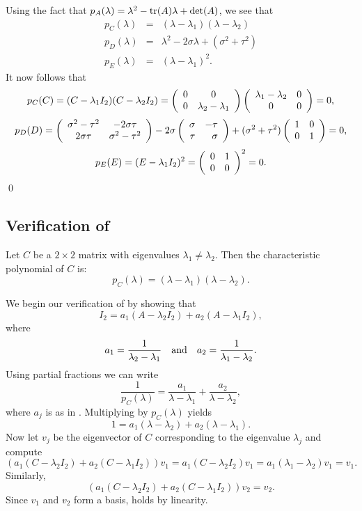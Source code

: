 Using the fact that $p_A(\lambda)=\lambda^2-{\rm tr}(A)\lambda+\det(A)$, we see
that
\begin{eqnarray*}
p_C(\lambda) & = & (\lambda-\lambda_1)(\lambda-\lambda_2) \\
p_D(\lambda) & = & \lambda^2 - 2\sigma \lambda + (\sigma^2+\tau^2) \\
p_E(\lambda) & = & (\lambda-\lambda_1)^2.
\end{eqnarray*}
It now follows that
\[
p_C(C) = (C-\lambda_1I_2)(C-\lambda_2I_2) =
\left(\begin{array}{cc} 0 & 0\\ 0 &\lambda_2-\lambda_1\end{array}\right)\left(\begin{array}{cc} \lambda_1-\lambda_2 & 0\\ 0 &0\end{array}\right)
=0,
\]
\[
p_D(D) =
\left(\begin{array}{cc} \sigma^2-\tau^2 & -2\sigma\tau\\ 2\sigma\tau &\sigma^2-\tau^2\end{array}\right)
-2\sigma \left(\begin{array}{rr} \sigma & -\tau\\ \tau &\sigma\end{array}\right) +
(\sigma^2+\tau^2)\left(\begin{array}{rr} 1 & 0\\ 0 &1\end{array}\right) = 0,
\]
\[
p_E(E) = (E-\lambda_1I_2)^2 = \left(\begin{array}{rr} 0 & 1\\ 0 &0\end{array}\right)^2 = 0.
\]
\qed



\subsection*{Verification of \protect{}}

Let $C$ be a $2\times 2$ matrix with eigenvalues $\lambda_1\neq\lambda_2$.
Then the characteristic polynomial of $C$ is:
\[
p_C(\lambda) = (\lambda-\lambda_1)(\lambda-\lambda_2).
\]

We begin our verification of  by showing that
\begin{equation}  \label{E:Inpart}
I_2 = a_1 (A - \lambda_2I_2) + a_2 (A - \lambda_1I_2),
\end{equation}
where
\begin{equation}  \label{E:pfcoeff}
a_1 = \frac{1}{\lambda_2-\lambda_1} \quad\mbox{and}\quad a_2 = \frac{1}{\lambda_1-\lambda_2}.
\end{equation}
Using partial fractions we can write
\begin{equation}  \label{E:partfrac}
\frac{1}{p_C(\lambda)} = \frac{a_1}{\lambda-\lambda_1} +
\frac{a_2}{\lambda-\lambda_2},
\end{equation}
where $a_j$ is as in .
Multiplying  by $p_C(\lambda)$ yields
\[
1 = a_1 (\lambda-\lambda_2) + a_2 (\lambda-\lambda_1).
\]
Now let $v_j$ be the eigenvector of $C$ corresponding to the eigenvalue
$\lambda_j$ and compute
\[
(a_1 (C - \lambda_2I_2) + a_2 (C - \lambda_1I_2))v_1 =
a_1(C - \lambda_2I_2)v_1 = a_1(\lambda_1-\lambda_2)v_1 = v_1.
\]
Similarly,
\[
(a_1 (C - \lambda_2I_2) + a_2 (C - \lambda_1I_2))v_2 = v_2.
\]
Since $v_1$ and $v_2$ form a basis,  holds by linearity.

